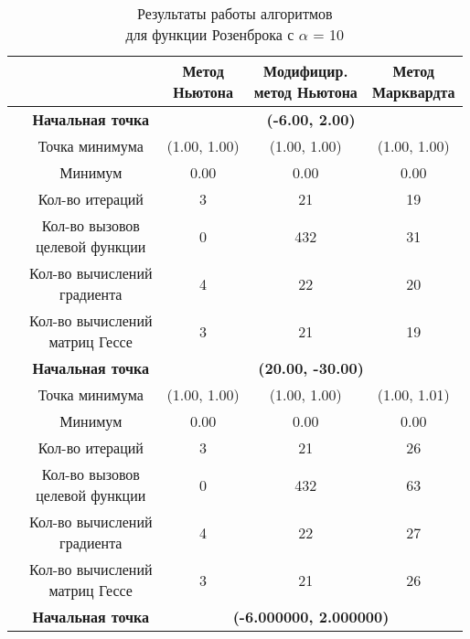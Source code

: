 \begin{table}[H]
        \centering
        \vspace*{-1.5em}
        \caption{Результаты работы алгоритмов\\для функции Розенброка с $\alpha$ = 10}
        \footnotesize
        \begin{tabular}{|c|c|c|c|c|}
        \hline
        & &\makecell{Метод\\Ньютона} &\makecell{Модифицир.\\метод Ньютона} &\makecell{Метод\\Марквардта} \\
        \hline
	\multirow{12}{*}{\rotatebox[origin=c]{90}{$\varepsilon = 0.01$}}&\textbf{Начальная точка} &\multicolumn{3}{c|}{\textbf{(-6.00, 2.00)}}\\
	\cline{2-5}
	&Точка минимума &(1.00, 1.00) &(1.00, 1.00) &(1.00, 1.00) \\ 
	\cline{2-5}
	&Минимум &0.00 &0.00 &0.00 \\ 
	\cline{2-5}
	&Кол-во итераций &3 &21 &19 \\ 
	\cline{2-5}
	&\makecell{Кол-во вызовов\\целевой функции} &0 &432 &31 \\ 
	\cline{2-5}
	&\makecell{Кол-во вычислений\\градиента} &4 &22 &20 \\ 
	\cline{2-5}
	&\makecell{Кол-во вычислений\\матриц Гессе} &3 &21 &19 \\ 
	\cline{2-5}
\cline{2-5}&\textbf{Начальная точка} &\multicolumn{3}{c|}{\textbf{(20.00, -30.00)}}\\
	\cline{2-5}
	&Точка минимума &(1.00, 1.00) &(1.00, 1.00) &(1.00, 1.01) \\ 
	\cline{2-5}
	&Минимум &0.00 &0.00 &0.00 \\ 
	\cline{2-5}
	&Кол-во итераций &3 &21 &26 \\ 
	\cline{2-5}
	&\makecell{Кол-во вызовов\\целевой функции} &0 &432 &63 \\ 
	\cline{2-5}
	&\makecell{Кол-во вычислений\\градиента} &4 &22 &27 \\ 
	\cline{2-5}
	&\makecell{Кол-во вычислений\\матриц Гессе} &3 &21 &26 \\ 
	\cline{2-5}
	\hline
	\multirow{12}{*}{\rotatebox[origin=c]{90}{$\varepsilon = 1e-06$}}&\textbf{Начальная точка} &\multicolumn{3}{c|}{\textbf{(-6.000000, 2.000000)}}\\

\end{tabular}
\end{table}
